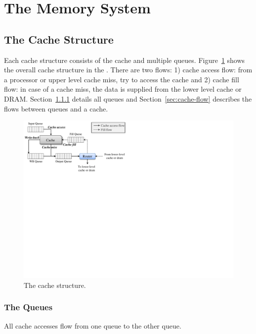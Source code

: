 
\clearpage
\section{The Memory System}

\subsection{The Cache Structure}

Each cache structure consists of the cache and multiple
queues. Figure~\ref{fig:cache} shows the overall cache structure in
the \SIM. There are two flows: 1) cache access flow: from a processor
or upper level cache miss, try to access the cache and 2) cache fill
flow: in case of a cache miss, the data is supplied from the lower
level cache or DRAM. Section~\ref{sec:queue} details all queues and
Section~\ref{sec:cache-flow} describes the flows between queues and a
cache.

\begin{figure}[htb]
\centering
\includegraphics{figs/cache}
\caption{The cache structure.}
\label{fig:cache}
\end{figure}


\subsubsection{The Queues}
\label{sec:queue}

All cache accesses flow from one queue to the other queue. 

